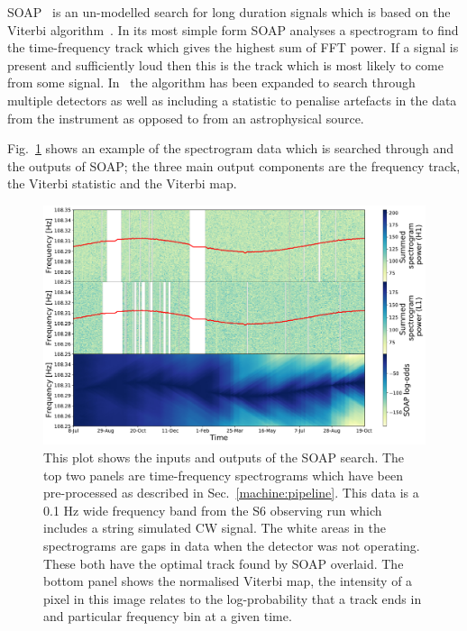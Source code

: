 %
SOAP~\cite{bayley2019SOAPGeneralised} is an un-modelled search for long
duration signals which is based on the Viterbi
algorithm~\cite{viterbi1967ErrorBounds}. In its most simple form SOAP
analyses a spectrogram to find the time-frequency track which gives the highest
sum of \gls{FFT} power. If a signal is present and sufficiently loud then this
is the track which is most likely to come from some signal.
In~\cite{bayley2019SOAPGeneralised} the algorithm has been expanded to
search through multiple detectors as well as including a statistic to penalise
artefacts in the data from the instrument as opposed to from an astrophysical
source. 

%
Fig.~\ref{soap:viterbiplot} shows an example of the spectrogram data which is
searched through and the outputs of SOAP; the three main output components are
the frequency track, the Viterbi statistic and the Viterbi map.

\begin{figure}[h]
	\includegraphics[scale=0.43]{C4_cnn/two_vit_example.pdf}
	\caption[Example SOAP output from H1 and L1 input spectrograms. ]{\label{soap:viterbiplot} This plot shows the inputs and outputs of the
		SOAP search. The top two panels are time-frequency spectrograms which have been pre-processed as described in Sec.~\ref{machine:pipeline}. This
		data is a 0.1 Hz wide frequency band from the S6 observing run \cite{}  which includes a string simulated \gls{CW} signal. The white areas in the spectrograms are gaps in data when the detector was not operating. These both have the
		optimal track found by SOAP overlaid. The bottom panel shows the normalised Viterbi map, the intensity of a
		pixel in this image relates to the log-probability that a track ends in and
		particular frequency bin at a given time.}
\end{figure}

